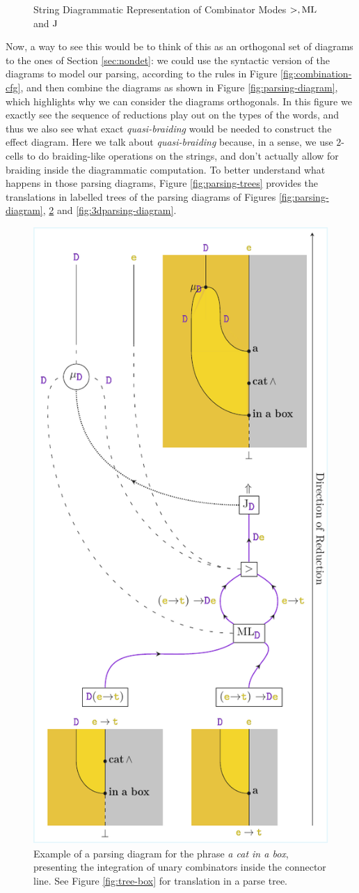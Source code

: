 \begin{figure}
	\centering
	
	\caption{String Diagrammatic Representation of Combinator Modes $>, \text{ML}$ and $\text{J}$}
	\label{fig:combinator-sd}
\end{figure}

Now, a way to see this would be to think of this as an orthogonal set of
diagrams to the ones of Section \ref{sec:nondet}: we could use the syntactic
version of the diagrams to model our parsing, according to the rules in
Figure \ref{fig:combination-cfg}, and then combine the diagrams as shown in
Figure \ref{fig:parsing-diagram}, which highlights why we can consider the
diagrams orthogonals.
In this figure we exactly see the sequence of reductions play out on the types
of the words, and thus we also see what exact \emph{quasi-braiding} would be
needed to construct the effect diagram.
Here we talk about \emph{quasi-braiding} because, in a sense, we use $2$-cells
to do braiding-like operations on the strings, and don't actually allow for
braiding inside the diagrammatic computation.
To better understand what happens in those parsing diagrams, Figure
\ref{fig:parsing-trees} provides the translations in labelled trees of the
parsing diagrams of Figures \ref{fig:parsing-diagram},
\ref{fig:parsing-diagram2} and \ref{fig:3dparsing-diagram}.

\begin{figure}
	\centering
	\includegraphics[width=.45\textwidth]{aux/figures/parsing-diagram2.pdf}
	\caption{Example of a parsing diagram for the phrase
		\emph{a cat in a box}, presenting the integration of unary combinators
		inside the connector line. See Figure \ref{fig:tree-box} for translation in
		a parse tree.}
	\label{fig:parsing-diagram2}
\end{figure}

